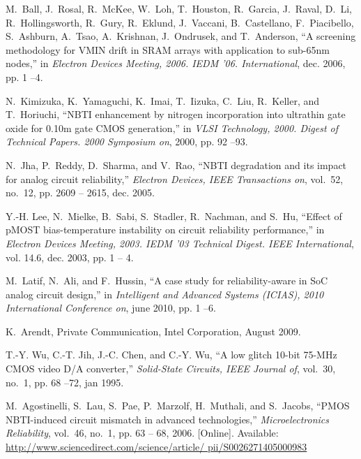 \documentclass[11pt,a4paper]{article}
\begin{document}
\begin{thebibliography}{10}
M.~Ball, J.~Rosal, R.~McKee, W.~Loh, T.~Houston, R.~Garcia, J.~Raval, D.~Li,
  R.~Hollingsworth, R.~Gury, R.~Eklund, J.~Vaccani, B.~Castellano,
  F.~Piacibello, S.~Ashburn, A.~Tsao, A.~Krishnan, J.~Ondrusek, and
  T.~Anderson, ``A screening methodology for {VMIN} drift in {SRAM} arrays with
  application to sub-65nm nodes,'' in \emph{Electron Devices Meeting, 2006.
  IEDM '06. International}, dec. 2006, pp. 1 --4.

N.~Kimizuka, K.~Yamaguchi, K.~Imai, T.~Iizuka, C.~Liu, R.~Keller, and
  T.~Horiuchi, ``{NBTI} enhancement by nitrogen incorporation into ultrathin
  gate oxide for 0.10m gate {CMOS} generation,'' in \emph{VLSI Technology,
  2000. Digest of Technical Papers. 2000 Symposium on}, 2000, pp. 92 --93.

N.~Jha, P.~Reddy, D.~Sharma, and V.~Rao, ``{NBTI} degradation and its impact
  for analog circuit reliability,'' \emph{Electron Devices, IEEE Transactions
  on}, vol.~52, no.~12, pp. 2609 -- 2615, dec. 2005.

Y.-H. Lee, N.~Mielke, B.~Sabi, S.~Stadler, R.~Nachman, and S.~Hu, ``Effect of
  {pMOST} bias-temperature instability on circuit reliability performance,'' in
  \emph{Electron Devices Meeting, 2003. IEDM '03 Technical Digest. IEEE
  International}, vol. 14.6, dec. 2003, pp. 1 -- 4.

M.~Latif, N.~Ali, and F.~Hussin, ``A case study for reliability-aware in {SoC}
  analog circuit design,'' in \emph{Intelligent and Advanced Systems (ICIAS),
  2010 International Conference on}, june 2010, pp. 1 --6.

K.~Arendt, Private Communication, Intel Corporation, August 2009.

T.-Y. Wu, C.-T. Jih, J.-C. Chen, and C.-Y. Wu, ``A low glitch 10-bit 75-{MHz}
  {CMOS} video {D/A} converter,'' \emph{Solid-State Circuits, IEEE Journal of},
  vol.~30, no.~1, pp. 68 --72, jan 1995.

\BIBentryALTinterwordspacing
M.~Agostinelli, S.~Lau, S.~Pae, P.~Marzolf, H.~Muthali, and S.~Jacobs, ``{PMOS
  NBTI}-induced circuit mismatch in advanced technologies,''
  \emph{Microelectronics Reliability}, vol.~46, no.~1, pp. 63 -- 68, 2006.
  [Online]. Available: \url{http://www.sciencedirect.com/science/article/
  pii/S0026271405000983}
\BIBentrySTDinterwordspacing

\end{thebibliography}
\end{document}
